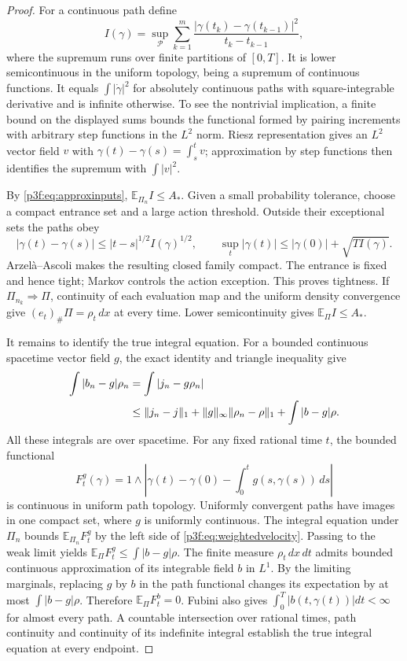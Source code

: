 \documentclass[11pt]{article}
\numberwithin{equation}{section}
\theoremstyle{definition}
\theoremstyle{remark}
\begin{document}
\begin{proof}
For a continuous path define
\[
 I(\gamma)=\sup_{\mathcal P}
       \sum_{k=1}^{m}
       \frac{|\gamma(t_k)-\gamma(t_{k-1})|^2}{t_k-t_{k-1}},
\]
where the supremum runs over finite partitions of $[0,T]$.
It is lower semicontinuous in the uniform topology, being a supremum
of continuous functions. It equals $\int|\dot\gamma|^2$ for
absolutely continuous paths with square-integrable derivative and
is infinite otherwise. To see the nontrivial implication, a finite
bound on the displayed sums bounds the functional formed by
pairing increments with arbitrary step functions in the $L^2$
norm. Riesz representation gives an $L^2$ vector field $v$ with
$\gamma(t)-\gamma(s)=\int_s^t v$; approximation by step functions
then identifies the supremum with $\int|v|^2$.

By \eqref{p3f:eq:approxinputs},
$\mathbb E_{\Pi_n}I\leq A_*$. Given a small probability tolerance,
choose a compact entrance set and a large action threshold.
Outside their exceptional sets the paths obey
\[
 |\gamma(t)-\gamma(s)|\leq
                 |t-s|^{1/2}I(\gamma)^{1/2},
 \qquad
 \sup_t|\gamma(t)|\leq|\gamma(0)|+\sqrt{TI(\gamma)} .
\]
Arzel\`a--Ascoli makes the resulting closed family compact.
The entrance is fixed and hence tight; Markov controls the action
exception. This proves tightness. If $\Pi_{n_k}\Rightarrow\Pi$,
continuity of each evaluation map and the uniform density
convergence give $(e_t)_\#\Pi=\rho_t\,dx$ at every time.
Lower semicontinuity gives $\mathbb E_\Pi I\leq A_*$.

It remains to identify the true integral equation. For a bounded
continuous spacetime vector field $g$, the exact identity and
triangle inequality give
\begin{align}
 \int|b_n-g|\rho_n
 &=\int|j_n-g\rho_n|\notag\\
 &\leq\|j_n-j\|_1+\|g\|_\infty\|\rho_n-\rho\|_1
                       +\int|b-g|\rho .
 \label{p3f:eq:weightedvelocity}
\end{align}
All these integrals are over spacetime. For any fixed rational time
$t$, the bounded functional
\[
 F^g_t(\gamma)=
 1\wedge\left|\gamma(t)-\gamma(0)
                   -\int_0^t g(s,\gamma(s))\,ds\right|
\]
is continuous in uniform path topology. Uniformly convergent paths
have images in one compact set, where $g$ is uniformly continuous.
The integral equation under $\Pi_n$ bounds
$\mathbb E_{\Pi_n}F^g_t$ by the left side of
\eqref{p3f:eq:weightedvelocity}. Passing to the weak limit yields
$\mathbb E_\Pi F^g_t\leq\int|b-g|\rho$.
The finite measure $\rho_t\,dx\,dt$ admits bounded continuous
approximation of its integrable field $b$ in $L^1$.
By the limiting marginals, replacing $g$ by $b$ in the path
functional changes its expectation by at most
$\int|b-g|\rho$. Therefore $\mathbb E_\Pi F^b_t=0$.
Fubini also gives $\int_0^T|b(t,\gamma(t))|dt<\infty$ for almost
every path. A countable intersection over rational times, path
continuity and continuity of its indefinite integral establish
the true integral equation at every endpoint.


\end{proof}
\end{document}
